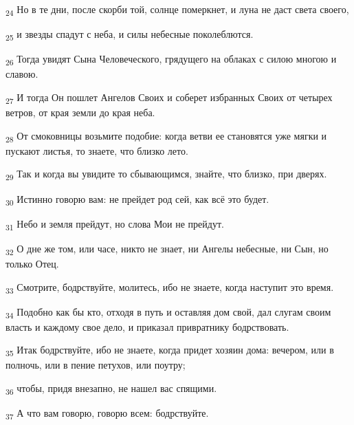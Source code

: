 \begin{tcolorbox}
\textsubscript{24} Но в те дни, после скорби той, солнце померкнет, и луна не даст света своего,
\end{tcolorbox}
\begin{tcolorbox}
\textsubscript{25} и звезды спадут с неба, и силы небесные поколеблются.
\end{tcolorbox}
\begin{tcolorbox}
\textsubscript{26} Тогда увидят Сына Человеческого, грядущего на облаках с силою многою и славою.
\end{tcolorbox}
\begin{tcolorbox}
\textsubscript{27} И тогда Он пошлет Ангелов Своих и соберет избранных Своих от четырех ветров, от края земли до края неба.
\end{tcolorbox}
\begin{tcolorbox}
\textsubscript{28} От смоковницы возьмите подобие: когда ветви ее становятся уже мягки и пускают листья, то знаете, что близко лето.
\end{tcolorbox}
\begin{tcolorbox}
\textsubscript{29} Так и когда вы увидите то сбывающимся, знайте, что близко, при дверях.
\end{tcolorbox}
\begin{tcolorbox}
\textsubscript{30} Истинно говорю вам: не прейдет род сей, как всё это будет.
\end{tcolorbox}
\begin{tcolorbox}
\textsubscript{31} Небо и земля прейдут, но слова Мои не прейдут.
\end{tcolorbox}
\begin{tcolorbox}
\textsubscript{32} О дне же том, или часе, никто не знает, ни Ангелы небесные, ни Сын, но только Отец.
\end{tcolorbox}
\begin{tcolorbox}
\textsubscript{33} Смотрите, бодрствуйте, молитесь, ибо не знаете, когда наступит это время.
\end{tcolorbox}
\begin{tcolorbox}
\textsubscript{34} Подобно как бы кто, отходя в путь и оставляя дом свой, дал слугам своим власть и каждому свое дело, и приказал привратнику бодрствовать.
\end{tcolorbox}
\begin{tcolorbox}
\textsubscript{35} Итак бодрствуйте, ибо не знаете, когда придет хозяин дома: вечером, или в полночь, или в пение петухов, или поутру;
\end{tcolorbox}
\begin{tcolorbox}
\textsubscript{36} чтобы, придя внезапно, не нашел вас спящими.
\end{tcolorbox}
\begin{tcolorbox}
\textsubscript{37} А что вам говорю, говорю всем: бодрствуйте.
\end{tcolorbox}
